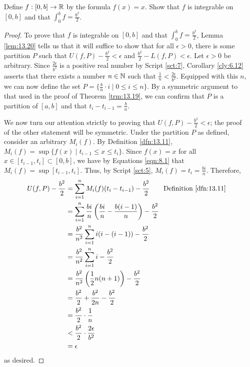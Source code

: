 \documentclass[../main.tex]{subfiles}
\begin{document}
\begin{exercise}\label{exr:13.21}
    Define $f:[0,b]\to\mathbb{R}$ by the formula $f(x)=x$. Show that $f$ is integrable on $[0,b]$ and that $\int_0^bf=\frac{b^2}{2}$.
    \begin{proof}
        To prove that $f$ is integrable on $[0,b]$ and that $\int_0^bf=\frac{b^2}{2}$, Lemma \ref{lem:13.20} tells us that it will suffice to show that for all $\epsilon>0$, there is some partition $P$ such that $U(f,P)-\frac{b^2}{2}<\epsilon$ and $\frac{b^2}{2}-L(f,P)<\epsilon$. Let $\epsilon>0$ be arbitrary. Since $\frac{2\epsilon}{b^2}$ is a positive real number by Script \ref{sct:7}, Corollary \ref{cly:6.12} asserts that there exists a number $n\in\mathbb{N}$ such that $\frac{1}{n}<\frac{2\epsilon}{b^2}$. Equipped with this $n$, we can now define the set $P=\{\frac{b}{n}\cdot i\mid 0\leq i\leq n\}$. By a symmetric argument to that used in the proof of Theorem \ref{trm:13.19}, we can confirm that $P$ is a partition of $[a,b]$ and that $t_i-t_{i-1}=\frac{b}{n}$.\par
        We now turn our attention strictly to proving that $U(f,P)-\frac{b^2}{2}<\epsilon$; the proof of the other statement will be symmetric. Under the partition $P$ as defined, consider an arbitrary $M_i(f)$. By Definition \ref{dfn:13.11}, $M_i(f)=\sup\{f(x)\mid t_{i-1}\leq x\leq t_i\}$. Since $f(x)=x$ for all $x\in[t_{i-1},t_i]\subset[0,b]$, we have by Equations \ref{eqn:8.1} that $M_i(f)=\sup[t_{i-1},t_i]$. Thus, by Script \ref{sct:5}, $M_i(f)=t_i=\frac{bi}{n}$. Therefore,
        \begin{align*}
            U(f,P)-\frac{b^2}{2} &= \sum_{i=1}^nM_i(f)(t_i-t_{i-1})-\frac{b^2}{2}\tag*{Definition \ref{dfn:13.11}}\\
            &= \sum_{i=1}^n\frac{bi}{n}\left( \frac{bi}{n}-\frac{b(i-1)}{n} \right)-\frac{b^2}{2}\\
            &= \frac{b^2}{n^2}\sum_{i=1}^ni(i-(i-1))-\frac{b^2}{2}\\
            &= \frac{b^2}{n^2}\sum_{i=1}^ni-\frac{b^2}{2}\\
            &= \frac{b^2}{n^2}\left( \frac{1}{2}n(n+1) \right)-\frac{b^2}{2}\\
            &= \frac{b^2}{2}+\frac{b^2}{2n}-\frac{b^2}{2}\\
            &= \frac{b^2}{2}\cdot\frac{1}{n}\\
            &< \frac{b^2}{2}\cdot\frac{2\epsilon}{b^2}\\
            &= \epsilon
        \end{align*}
        as desired.
    \end{proof}
\end{exercise}
\end{document}
